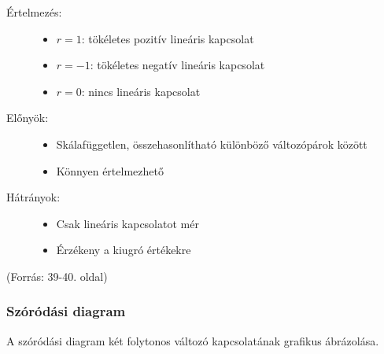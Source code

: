 \documentclass[a4paper,12pt]{article}
\begin{document}
    \begin{description}
        \item[Értelmezés:]
        \begin{itemize}
            \item $r = 1$: tökéletes pozitív lineáris kapcsolat
            \item $r = -1$: tökéletes negatív lineáris kapcsolat
            \item $r = 0$: nincs lineáris kapcsolat
        \end{itemize}
        \item[Előnyök:]
        \begin{itemize}
            \item Skálafüggetlen, összehasonlítható különböző változópárok között
            \item Könnyen értelmezhető
        \end{itemize}
        \item[Hátrányok:]
        \begin{itemize}
            \item Csak lineáris kapcsolatot mér
            \item Érzékeny a kiugró értékekre
        \end{itemize}
    \end{description}

    (Forrás: 39-40. oldal)

    \subsubsection{Szóródási diagram}

    A szóródási diagram két folytonos változó kapcsolatának grafikus ábrázolása.
\end{document}
